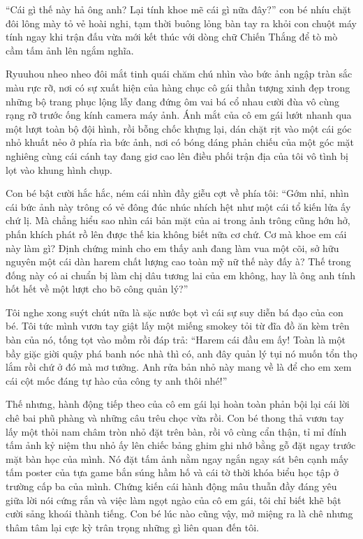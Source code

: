 \documentclass[../main.tex]{subfiles}
\begin{document}
``Cái gì thế này hả ông anh? Lại tính khoe mẽ cái gì nữa đây?'' con bé nhíu chặt đôi lông mày tỏ vẻ hoài nghi, tạm thời buông lỏng bàn tay ra khỏi con chuột máy tính ngay khi trận đấu vừa mới kết thúc với dòng chữ Chiến Thắng để tò mò cầm tấm ảnh lên ngắm nghĩa.

Ryuuhou nheo nheo đôi mắt tinh quái chăm chú nhìn vào bức ảnh ngập tràn sắc màu rực rỡ, nơi có sự xuất hiện của hàng chục cô gái thần tượng xinh đẹp trong những bộ trang phục lộng lẫy đang đứng ôm vai bá cổ nhau cười đùa vô cùng rạng rỡ trước ống kính camera máy ảnh. Ánh mắt của cô em gái lướt nhanh qua một lượt toàn bộ đội hình, rồi bỗng chốc khựng lại, dán chặt rịt vào một cái góc nhỏ khuất nẻo ở phía rìa bức ảnh, nơi có bóng dáng phản chiếu của một góc mặt nghiêng cùng cái cánh tay đang giơ cao lên điều phối trận địa của tôi vô tình bị lọt vào khung hình chụp.

Con bé bật cười hắc hắc, ném cái nhìn đầy giễu cợt về phía tôi: ``Gớm nhỉ, nhìn cái bức ảnh này trông có vẻ đông đúc nhúc nhích hệt như một cái tổ kiến lửa ấy chứ lị. Mà chẳng hiểu sao nhìn cái bản mặt của ai trong ảnh trông cũng hớn hở, phấn khích phát rồ lên được thế kia không biết nữa cơ chứ. Cơ mà khoe em cái này làm gì? Định chứng minh cho em thấy anh đang làm vua một cõi, sở hữu nguyên một cái dàn harem chất lượng cao toàn mỹ nữ thế này đấy à? Thế trong đống này có ai chuẩn bị làm chị dâu tương lai của em không, hay là ông anh tính hốt hết về một lượt cho bõ công quản lý?''

Tôi nghe xong suýt chút nữa là sặc nước bọt vì cái sự suy diễn bá đạo của con bé. Tôi tức mình vươn tay giật lấy một miếng smokey tỏi từ đĩa đồ ăn kèm trên bàn của nó, tống tọt vào mồm rồi đáp trả: ``Harem cái đầu em ấy! Toàn là một bầy giặc giời quậy phá banh nóc nhà thì có, anh đây quản lý tụi nó muốn tổn thọ lắm rồi chứ ở đó mà mơ tưởng. Anh rửa bản nhỏ này mang về là để cho em xem cái cột mốc đáng tự hào của công ty anh thôi nhé!''

Thế nhưng, hành động tiếp theo của cô em gái lại hoàn toàn phản bội lại cái lời chê bai phũ phàng và những câu trêu chọc vừa rồi. Con bé thong thả vươn tay lấy một thỏi nam châm tròn nhỏ đặt trên bàn, rồi vô cùng cẩn thận, tỉ mỉ đính tấm ảnh kỷ niệm thu nhỏ ấy lên chiếc bảng ghim ghi nhớ bằng gỗ đặt ngay trước mặt bàn học của mình. Nó đặt tấm ảnh nằm ngay ngắn ngay sát bên cạnh mấy tấm poster của tựa game bắn súng hầm hố và cái tờ thời khóa biểu học tập ở trường cấp ba của mình. Chứng kiến cái hành động mâu thuẫn đầy đáng yêu giữa lời nói cứng rắn và việc làm ngọt ngào của cô em gái, tôi chỉ biết khẽ bật cười sảng khoái thành tiếng. Con bé lúc nào cũng vậy, mở miệng ra là chê nhưng thâm tâm lại cực kỳ trân trọng những gì liên quan đến tôi.
\end{document}
